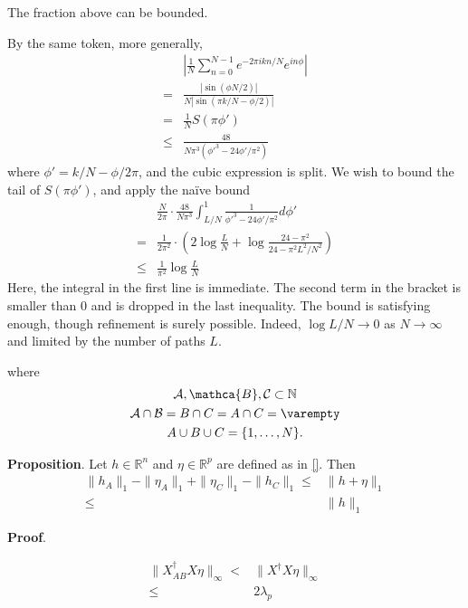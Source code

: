 \documentclass[12pt]{article}
\begin{document}
The fraction above can be bounded.

By the same token, more generally,
\begin{align*}
&\left| \frac{1}{N} \sum_{n=0}^{N-1} e^{-2\pi i k n/N} e^{i n \phi} \right| \\
=&\frac{|\sin( \phi N /2 )|}{N |\sin( \pi k /N -\phi /2 )|} \\
=&\frac{1}{N} S(\pi \phi') \\
\leq& \frac{48}{N \pi^3 (\phi'^3 -24 \phi' /\pi^2)}
\end{align*}
where \(\phi' =k/N -\phi/2\pi\), and the cubic expression is split.
We wish to bound the tail of \(S(\pi \phi')\), and apply the na\"ive bound
\begin{align*}
&\frac{N}{2\pi} \cdot \frac{48}{N \pi^3} \int_{L/N}^1 \frac{1}{\phi'^3 -24 \phi' /\pi^2}
 d\phi' \\
=&\frac{1}{2\pi^2} \cdot \left( 2 \log \frac{L}{N} +\log \frac{24-\pi^2}{24-\pi^2 L^2 /N^2} \right) \\
\leq& \frac{1}{\pi^2} \log \frac{L}{N}
\end{align*}
Here, the integral in the first line is immediate.
The second term in the bracket is smaller than 0 and is dropped in the last inequality.
The bound is satisfying enough, though refinement is surely possible.
Indeed, \(\log L/N \to 0\) as \(N \to \infty\) and limited by the number of paths \(L\).


where
\begin{gather*}
\mathcal{A}, \mathca{B}, \mathcal{C} \subset \mathbb{N} \\
\mathcal{A} \cap \mathcal{B} =B \cap C =A \cap C =\varempty \\
A \cup B \cup C =\{1, \dotsc, N\}.
\end{gather*}


\textbf{Proposition}.
Let \(h \in \mathbb{R}^n\) and \(\eta \in \mathbb{R}^p\) are defined as in \eqref{}.
Then
\begin{align*}
\|h_A\|_1 -\|\eta_A\|_1 +\|\eta_C\|_1 -\|h_C\|_1
\leq& \|h +\eta\|_1 \\
\leq& \|h\|_1
\end{align*}

\textbf{Proof}.


\begin{align*}
\|X^\dagger_{AB} X \eta\|_\infty
<&\|X^\dagger X \eta\|_\infty \\
\leq& 2 \lambda_p
\end{align*}
\end{document}

